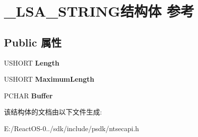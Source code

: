 \hypertarget{struct___l_s_a___s_t_r_i_n_g}{}\section{\+\_\+\+L\+S\+A\+\_\+\+S\+T\+R\+I\+N\+G结构体 参考}
\label{struct___l_s_a___s_t_r_i_n_g}
\subsection*{Public 属性}
\begin{DoxyCompactItemize}
\item 
\mbox{\label{struct___l_s_a___s_t_r_i_n_g_a180979f46a342d2ff8d63169f5bb0392}} 
U\+S\+H\+O\+RT {\bfseries Length}
\item 
\mbox{\label{struct___l_s_a___s_t_r_i_n_g_a062d03f06786a3f25ca443280700cc1c}} 
U\+S\+H\+O\+RT {\bfseries Maximum\+Length}
\item 
\mbox{\label{struct___l_s_a___s_t_r_i_n_g_aafbb82c8e1a16085323a05ad5c002f8e}} 
P\+C\+H\+AR {\bfseries Buffer}
\end{DoxyCompactItemize}


该结构体的文档由以下文件生成\+:\begin{DoxyCompactItemize}
\item 
E\+:/\+React\+O\+S-\/0../sdk/include/psdk/ntsecapi.\+h\end{DoxyCompactItemize}
